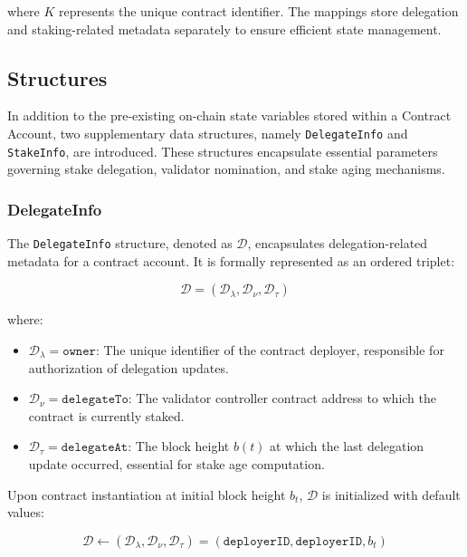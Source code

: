 \documentclass{article}
\begin{document}
where \( K \) represents the unique contract identifier. The mappings store delegation and staking-related metadata separately to ensure efficient state management.

\subsection{Structures}

In addition to the pre-existing on-chain state variables stored within a Contract Account, two supplementary data structures, namely \texttt{DelegateInfo} and \texttt{StakeInfo}, are introduced. These structures encapsulate essential parameters governing stake delegation, validator nomination, and stake aging mechanisms.

\subsubsection{DelegateInfo}  

The \texttt{DelegateInfo} structure, denoted as $\mathcal{D}$, encapsulates delegation-related metadata for a contract account. It is formally represented as an ordered triplet:

\begin{equation}
\mathcal{D} = (\mathcal{D}_\lambda, \mathcal{D}_\nu, \mathcal{D}_\tau)
\end{equation}

where:  
\begin{itemize}
    \item $\mathcal{D}_\lambda = \texttt{owner}$: The unique identifier of the contract deployer, responsible for authorization of delegation updates.
    \item $\mathcal{D}_\nu = \texttt{delegateTo}$: The validator controller contract address to which the contract is currently staked.
    \item $\mathcal{D}_\tau = \texttt{delegateAt}$: The block height $b(t)$ at which the last delegation update occurred, essential for stake age computation.
\end{itemize}

Upon contract instantiation at initial block height $b_t$, $\mathcal{D}$ is initialized with default values:

\begin{equation}
\mathcal{D} \gets (\mathcal{D}_\lambda, \mathcal{D}_\nu, \mathcal{D}_\tau) = (\texttt{deployerID}, \texttt{deployerID}, b_t)
\end{equation}
\end{document}
